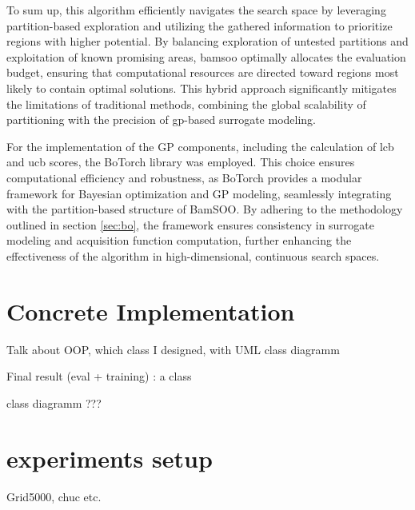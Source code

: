 To sum up, this algorithm efficiently navigates the search space by leveraging partition-based exploration and utilizing the gathered information to prioritize regions with higher potential. By balancing exploration of untested partitions and exploitation of known promising areas, \acrshort{bamsoo} optimally allocates the evaluation budget, ensuring that computational resources are directed toward regions most likely to contain optimal solutions. This hybrid approach significantly mitigates the limitations of traditional methods, combining the global scalability of partitioning with the precision of \acrshort{gp}-based surrogate modeling.

For the implementation of the GP components, including the calculation of \acrshort{lcb} and \acrshort{ucb} scores, the BoTorch library was employed. This choice ensures computational efficiency and robustness, as BoTorch provides a modular framework for Bayesian optimization and GP modeling, seamlessly integrating with the partition-based structure of BamSOO. By adhering to the methodology outlined in section \ref{sec:bo}, the framework ensures consistency in surrogate modeling and acquisition function computation, further enhancing the effectiveness of the algorithm in high-dimensional, continuous search spaces.

\FloatBarrier

\section{Concrete Implementation}
\label{sec:concrete_impl}
Talk about OOP, which class I designed, with UML class diagramm

Final result (eval + training) : a class 

class diagramm ???

\section{experiments setup}
\label{sec:exp_setup}

Grid5000, chuc etc.


